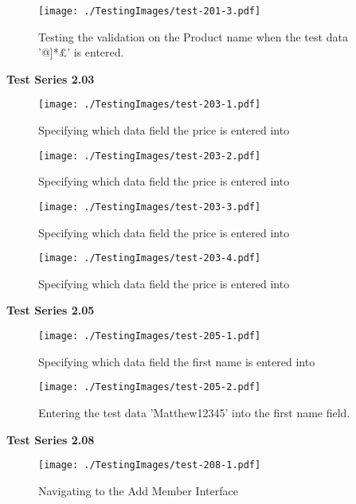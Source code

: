 \begin{figure}[H]
    \texttt{[image: ./TestingImages/test-201-3.pdf]}
    \caption{Testing the validation on the Product name when the test data '@]*£' is entered.}  \label{fig:test-201-3}
\end{figure}

\textbf{Test Series 2.03}

\begin{figure}[H]
    \texttt{[image: ./TestingImages/test-203-1.pdf]}
    \caption{Specifying which data field the price is entered into}  \label{fig:test-203-1}
\end{figure}

\begin{figure}[H]
    \texttt{[image: ./TestingImages/test-203-2.pdf]}
    \caption{Specifying which data field the price is entered into}  \label{fig:test-203-2}
\end{figure}

\begin{figure}[H]
    \texttt{[image: ./TestingImages/test-203-3.pdf]}
    \caption{Specifying which data field the price is entered into}  \label{fig:test-203-3}
\end{figure}

\begin{figure}[H]
    \texttt{[image: ./TestingImages/test-203-4.pdf]}
    \caption{Specifying which data field the price is entered into}  \label{fig:test-203-4}
\end{figure}

\textbf{Test Series 2.05}

\begin{figure}[H]
    \texttt{[image: ./TestingImages/test-205-1.pdf]}
    \caption{Specifying which data field the first name is entered into}  \label{fig:test-205-1}
\end{figure}

\begin{figure}[H]
    \texttt{[image: ./TestingImages/test-205-2.pdf]}
    \caption{Entering the test data 'Matthew12345' into the first name field.}  \label{fig:test-205-2}
\end{figure}

\textbf{Test Series 2.08}

\begin{figure}[H]
    \texttt{[image: ./TestingImages/test-208-1.pdf]}
    \caption{Navigating to the Add Member Interface}  \label{fig:test-208-1}
\end{figure}

